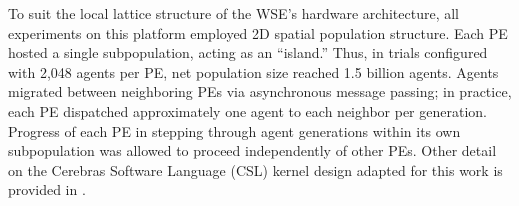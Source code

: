 
To suit the local lattice structure of the WSE's hardware architecture, all experiments on this platform employed 2D spatial population structure.
Each PE hosted a single subpopulation, acting as an ``island.''
Thus, in trials configured with 2,048 agents per PE, net population size reached 1.5 billion agents.
Agents migrated between neighboring PEs via asynchronous message passing;
in practice, each PE dispatched approximately one agent to each neighbor per generation.
Progress of each PE in stepping through agent generations within its own subpopulation was allowed to proceed independently of other PEs.
Other detail on the Cerebras Software Language (CSL) kernel design adapted for this work is provided in \citet{moreno2024trackable}.





